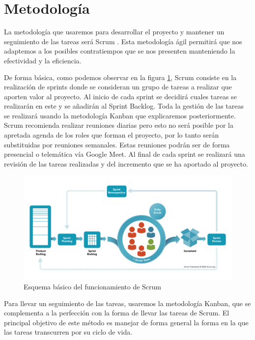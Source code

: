 \section{Metodología}
La metodología que usaremos para desarrollar el proyecto y mantener un seguimiento de las tareas será Scrum \cite{scrum}. Esta metodología ágil permitirá que nos adaptemos a los posibles contratiempos que se nos presenten manteniendo la efectividad y la eficiencia. 

De forma básica, como podemos observar en la figura \ref{fig:scrum_esquema}, Scrum consiste en la realización de sprints donde se consideran un grupo de tareas a realizar que aporten valor al proyecto. Al inicio de cada sprint se decidirá cuales tareas se realizarán en este y se añadirán al Sprint Backlog. Toda la gestión de las tareas se realizará usando la metodología Kanban que explicaremos posteriormente. Scrum recomienda realizar reuniones diarias pero esto no será posible por la apretada agenda de los roles que forman el proyecto, por lo tanto serán substituidas por reuniones semanales. Estas reuniones podrán ser de forma presencial o telemática vía Google Meet. Al final de cada sprint se realizará una revisión de las tareas realizadas y del incremento que se ha aportado al proyecto.

\begin{figure}[h]
    \centering
    \includegraphics[width=1\textwidth]{img/scrum.png}
    \caption{Esquema básico del funcionamiento de Scrum \cite{scrum}}
    \label{fig:scrum_esquema}
\end{figure}

Para llevar un seguimiento de las tareas, usaremos la metodología Kanban, que se complementa a la perfección con la forma de llevar las tareas de Scrum. El principal objetivo de este método es manejar de forma general la forma en la que las tareas transcurren por su ciclo de vida. 

